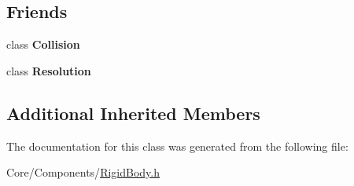 \subsection*{Friends}
\begin{DoxyCompactItemize}
\item 
\hypertarget{classDCEngine_1_1Components_1_1RigidBody_aa08e39e5a8a0a97f10c15f0c5d98013b}{class {\bfseries Collision}}\label{classDCEngine_1_1Components_1_1RigidBody_aa08e39e5a8a0a97f10c15f0c5d98013b}

\item 
\hypertarget{classDCEngine_1_1Components_1_1RigidBody_a29bcc411593bce42afc9222fc174d7f9}{class {\bfseries Resolution}}\label{classDCEngine_1_1Components_1_1RigidBody_a29bcc411593bce42afc9222fc174d7f9}

\end{DoxyCompactItemize}
\subsection*{Additional Inherited Members}


The documentation for this class was generated from the following file\-:\begin{DoxyCompactItemize}
\item 
Core/\-Components/\hyperlink{RigidBody_8h}{Rigid\-Body.\-h}\end{DoxyCompactItemize}

